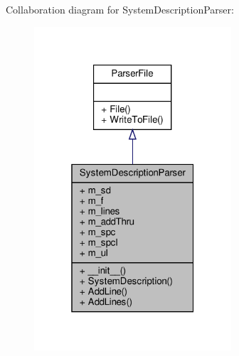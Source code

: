 Collaboration diagram for System\+Description\+Parser\+:
\nopagebreak
\begin{figure}[H]
\begin{center}
\leavevmode
\includegraphics[width=208pt]{classSignalIntegrity_1_1Parsers_1_1SystemDescriptionParser_1_1SystemDescriptionParser__coll__graph}
\end{center}
\end{figure}
